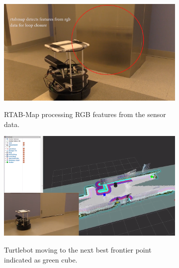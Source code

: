\begin{figure}
    \begin{subfigure}[b]{0.497\textwidth}
		\includegraphics[width=\textwidth, height=0.7\textwidth]{images/loop1.png}
		\label{subfig:a}
		\caption{RTAB-Map processing RGB features from the sensor data.}
		\vspace{2em}
	\end{subfigure}
	\begin{subfigure}[b]{0.497\textwidth}
		\includegraphics[width=\textwidth, height=0.7\textwidth]{images/loop2.png}
		\label{subfig:b}
		\caption{Turtlebot moving to the next best frontier point indicated as green cube.}
		\vspace{2em}
	\end{subfigure}
	\begin{subfigure}[b]{0.497\textwidth}

\end{subfigure}
\end{figure}
